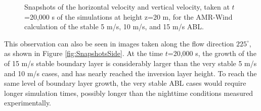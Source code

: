 \begin{figure}[hbt!]
  \caption{ \label{fig:SnapshotsZ20} Snapshots of the horizontal
    velocity and vertical velocity, taken at $t$=20,000 s of the
    simulations at height z=20 m, for the AMR-Wind calculation of the
    stable 5 m/s, 10 m/s, and 15 m/s ABL. }
\end{figure}

This observation can also be seen in images taken along the flow
direction $225^\circ$, as shown in Figure
\ref{fig:SnapshotsSide}.  At the time $t$=20,000 s, the growth of the
of 15 m/s stable boundary layer is considerably larger than the very
stable 5 m/s and 10 m/s cases, and has nearly reached the inversion
layer height.  To reach the same level of boundary layer growth, the
very stable ABL cases would require longer simulation times, possibly
longer than the nighttime conditions measured experimentally.

